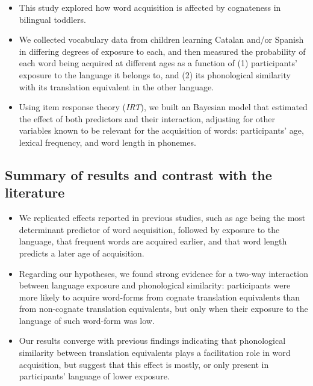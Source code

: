 \documentclass[
  letterpaper,
  DIV=11,
  numbers=noendperiod]{scrartcl}
\providecommand{\tightlist}{%
  \setlength{\itemsep}{0pt}\setlength{\parskip}{0pt}}\usepackage{longtable,booktabs,array}
\begin{document}
\begin{itemize}
\tightlist
\item
  This study explored how word acquisition is affected by cognateness in
  bilingual toddlers.
\item
  We collected vocabulary data from children learning Catalan and/or
  Spanish in differing degrees of exposure to each, and then measured
  the probability of each word being acquired at different ages as a
  function of (1) participants' exposure to the language it belongs to,
  and (2) its phonological similarity with its translation equivalent in
  the other language.
\item
  Using item response theory (\emph{IRT}), we built an Bayesian model
  that estimated the effect of both predictors and their interaction,
  adjusting for other variables known to be relevant for the acquisition
  of words: participants' age, lexical frequency, and word length in
  phonemes.
\end{itemize}

\hypertarget{summary-of-results-and-contrast-with-the-literature}{%
\subsection{Summary of results and contrast with the
literature}\label{summary-of-results-and-contrast-with-the-literature}}

\begin{itemize}
\tightlist
\item
  We replicated effects reported in previous studies, such as age being
  the most determinant predictor of word acquisition, followed by
  exposure to the language, that frequent words are acquired earlier,
  and that word length predicts a later age of acquisition.
\item
  Regarding our hypotheses, we found strong evidence for a two-way
  interaction between language exposure and phonological similarity:
  participants were more likely to acquire word-forms from cognate
  translation equivalents than from non-cognate translation equivalents,
  but only when their exposure to the language of such word-form was
  low.
\item
  Our results converge with previous findings indicating that
  phonological similarity between translation equivalents plays a
  facilitation role in word acquisition, but suggest that this effect is
  mostly, or only present in participants' language of lower exposure.
\end{itemize}
\end{document}
